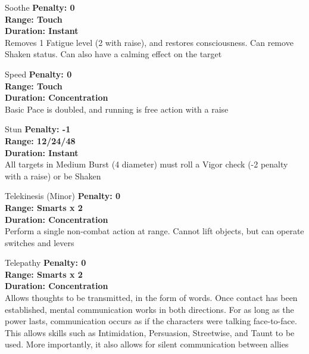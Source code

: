 \begin{multicols}{2}
\begin{genericsection}{Soothe}
\textbf{Penalty: 0}\\
\textbf{Range: Touch}\\
\textbf{Duration: Instant}\\
Removes 1 Fatigue level (2 with raise), and restores consciousness. Can remove Shaken status. Can also have a calming effect on the target
\end{genericsection}

\begin{genericsection}{Speed}
\textbf{Penalty: 0}\\
\textbf{Range: Touch}\\
\textbf{Duration: Concentration}\\
Basic Pace is doubled, and running is free action with a raise
\end{genericsection}

\begin{genericsection}{Stun}
\textbf{Penalty: -1}\\
\textbf{Range: 12/24/48}\\
\textbf{Duration: Instant}\\
All targets in Medium Burst (4 diameter) must roll a Vigor check (-2 penalty with a raise) or be Shaken\\
\end{genericsection}

\begin{genericsection}{Telekinesis (Minor)}
\textbf{Penalty: 0}\\
\textbf{Range: Smarts x 2}\\
\textbf{Duration: Concentration}\\ 
Perform a single non-combat action at range. Cannot lift objects, but can operate switches and levers
\end{genericsection}

\begin{genericsection}{Telepathy}
\textbf{Penalty: 0}\\
\textbf{Range: Smarts x 2}\\
\textbf{Duration: Concentration}\\
Allows thoughts to be transmitted, in the form of words. Once contact has been established, mental communication works in both directions. For as long as the power lasts, communication occurs as if the characters were talking face-to-face. This allows skills such as Intimidation, Persuasion, Streetwise, and Taunt to be used. More importantly, it also allows for silent communication between allies
\end{genericsection}


\end{multicols}
